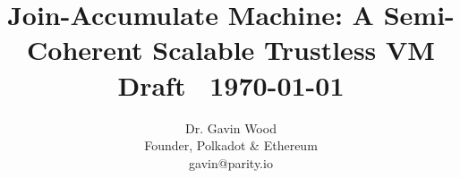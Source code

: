 \newcommand*{\maybe}[1]{\mathord{\text{¿}}#1}
\newcommand*{\se}{\mathcal{E}}
\newcommand*{\de}{\mathcal{E}^{-1}}
\newcommand*{\tricolon}{\!\mathrel{\vcenter{\offinterlineskip%
\hbox{\scalebox{0.5}[0.5]{${\scriptscriptstyle \blacktriangleright}$}}
\vskip.15ex
\hbox{\scalebox{0.5}[0.5]{${\scriptscriptstyle \blacktriangleright}$}}
}}}
\newcommand*{\is}[2]{#1\tricolon#2}
\newcommand*{\isa}[2]{#1\in #2}
\newcommand*{\ts}{,\,}
\newcommand*{\lseq}{\left\lsem}
\newcommand*{\rseq}{\right\rsem}
\newcommand*{\ltup}{\!\left\lgroup}
\newcommand*{\rtup}{\right\rgroup\!}
\newcommand*{\ltuple}{\!\left\lgroup}
\newcommand*{\rtuple}{\right\rgroup\!}
\newcommand*{\sq}[1]{\left[#1\right]}
\newcommand*{\seq}[1]{\lseq#1\rseq}
\newcommand*{\tup}[1]{\ltup#1\rtup}
\newcommand*{\tuple}[1]{\ltuple#1\rtuple}
\newcommand*{\floor}[1]{\left\lfloor#1\right\rfloor}
\newcommand*{\ceil}[1]{\left\lceil#1\right\rceil}
\newcommand*{\fnfrac}[2]{\left\lfloor\nicefrac{#1}{#2}\right\rfloor}
\newcommand*{\ffrac}[2]{\left\lfloor\frac{#1}{#2}\right\rfloor}
\newcommand*{\transpose}{{}^\text{T}}

\newcommand*{\goodset}{\psi_\mathbf{g}}
\newcommand*{\badset}{\psi_\mathbf{b}}
\newcommand*{\wonkyset}{\psi_\mathbf{w}}
\newcommand*{\offenders}{\psi_\mathbf{o}}
\newcommand*{\xttickets}{\mathbf{E}_T}
\newcommand*{\xtdisputes}{\mathbf{E}_D}
\newcommand*{\xtguarantees}{\mathbf{E}_G}
\newcommand*{\xtassurances}{\mathbf{E}_A}
\newcommand*{\xtpreimages}{\mathbf{E}_P}

\newcommand*{\jamdraftversion}{\!\!\!}
\newcommand*{\jamdraftversionstring}{\jamdraftversion}

\newcommand*{\makegpbackground}{
  \AddToShipoutPicture{
    \checkoddpage
    \ifoddpage
        \put(-1 mm,0){\texttt{[image: assets/grayr.png]}}
    \else
        \put(-1 mm,0){\texttt{[image: assets/grayl.png]}}
    \fi
  }
}


\title[JAM: Join-Accumulate Machine \\ {\smaller \textbf{Draft \jamdraftversionstring\ \today}}]{Join-Accumulate Machine: A Semi-Coherent Scalable Trustless VM \\ {\smaller Draft \jamdraftversionstring\ \today}}
\author{
  Dr. Gavin Wood\\
  Founder, Polkadot \& Ethereum\\%
   gavin@parity.io }
